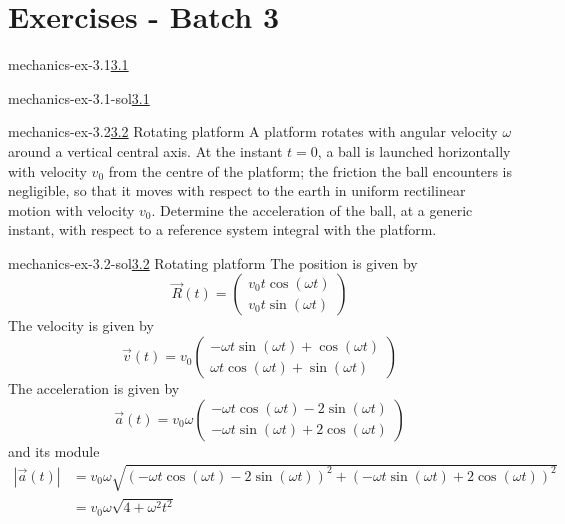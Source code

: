 \documentclass[preview]{standalone}
\begin{document}
\genpage

\section{Exercises - Batch 3}

\begin{snippetexercise}{mechanics-ex-3.1}{\underline{3.1}}
    \todo
\end{snippetexercise}

\begin{snippetsolution}{mechanics-ex-3.1-sol}{\underline{3.1}}
    \todo
\end{snippetsolution}

\begin{snippetexercise}{mechanics-ex-3.2}{\underline{3.2} Rotating platform}
    A platform rotates with angular velocity
    \(\omega\) around a vertical central axis.
    At the instant \(t = 0\), a ball is launched horizontally with velocity \(v_0\)
    from the centre of the platform; the friction the ball encounters is negligible,
    so that it moves with respect to the earth in uniform rectilinear motion with velocity \(v_0\).
    Determine the acceleration of the ball, at a generic instant, with respect to a reference system
    integral with the platform.
\end{snippetexercise}

\begin{snippetsolution}{mechanics-ex-3.2-sol}{\underline{3.2} Rotating platform}
    The position is given by
    \[
        \vec{R}(t) = \begin{pmatrix}
            v_0t\cos(\omega t) \\
            v_0t\sin(\omega t)
        \end{pmatrix}
    \]
    The velocity is given by
    \[
        \vec{v}(t) = v_0 \begin{pmatrix}
            -\omega t \sin(\omega t) + \cos(\omega t) \\
            \omega t \cos(\omega t) + \sin(\omega t)
        \end{pmatrix}
    \]
    The acceleration is given by
    \[
        \vec{a}(t) = v_0 \omega \begin{pmatrix}
            -\omega t \cos(\omega t) - 2\sin(\omega t) \\
            -\omega t \sin(\omega t) + 2\cos(\omega t)
        \end{pmatrix}
    \]
    and its module
    \begin{align*}
        |\vec{a}(t)| &= v_0 \omega \sqrt{
            {(-\omega t \cos(\omega t) - 2\sin(\omega t))}^2 + {(-\omega t \sin(\omega t) + 2\cos(\omega t))}^2
        } \\
        &= v_0 \omega \sqrt{4 + \omega^2t^2}
    \end{align*}
\end{snippetsolution}
\end{document}
